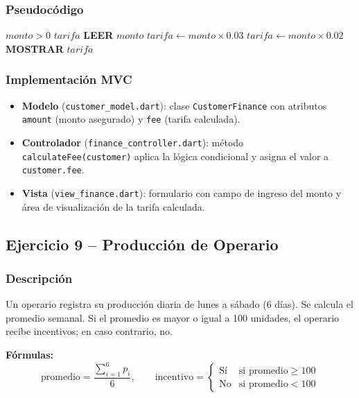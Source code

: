 \documentclass[12pt,a4paper]{article}
\begin{document}
\subsubsection{Pseudocódigo}

\begin{algorithm}[H]
\caption{Cálculo de Tarifa de Seguro}
\label{alg:seguro}
\begin{algorithmic}[1]
  \Require $monto > 0$
  \Ensure $tarifa$
  \State \textbf{LEER} $monto$
    \State $tarifa \leftarrow monto \times 0.03$
  \Else
    \State $tarifa \leftarrow monto \times 0.02$
  \EndIf
  \State \textbf{MOSTRAR} $tarifa$
\end{algorithmic}
\end{algorithm}

\subsubsection{Implementación MVC}

\begin{itemize}
  \item \textbf{Modelo} (\texttt{customer\_model.dart}): clase \texttt{CustomerFinance} con atributos \texttt{amount} (monto asegurado) y \texttt{fee} (tarifa calculada).
  \item \textbf{Controlador} (\texttt{finance\_controller.dart}): método \texttt{calculateFee(customer)} aplica la lógica condicional y asigna el valor a \texttt{customer.fee}.
  \item \textbf{Vista} (\texttt{view\_finance.dart}): formulario con campo de ingreso del monto y área de visualización de la tarifa calculada.
\end{itemize}

\subsection{Ejercicio 9 -- Producción de Operario}

\subsubsection{Descripción}

Un operario registra su producción diaria de lunes a sábado (6 días). Se calcula el promedio semanal. Si el promedio es mayor o igual a 100 unidades, el operario recibe incentivos; en caso contrario, no.

\textbf{Fórmulas:}
\[
  \text{promedio} = \frac{\displaystyle\sum_{i=1}^{6} p_i}{6}, \qquad
  \text{incentivo} = \begin{cases} \text{Sí} & \text{si } \text{promedio} \geq 100 \\ \text{No} & \text{si } \text{promedio} < 100 \end{cases}
\]
\end{document}
